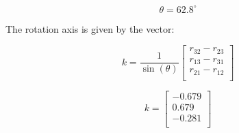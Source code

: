 \documentclass{exam}
\begin{document}
\begin{questions}
\begin{parts}
\begin{equation}
  \theta = 62.8^{\circ}
\end{equation}

The rotation axis is given by the vector:

\begin{equation}
  k = \frac{1}{ \sin(\theta) } \begin{bmatrix}
                                  r_{32} - r_{23} \\
				  r_{13} - r_{31} \\
				  r_{21} - r_{12} \\
				\end{bmatrix}
\end{equation}

\begin{equation}
  k = \begin{bmatrix}
        -0.679 \\
	0.679  \\
	-0.281 \\
      \end{bmatrix}
\end{equation}

\end{parts}

\end{questions}
\end{document}
